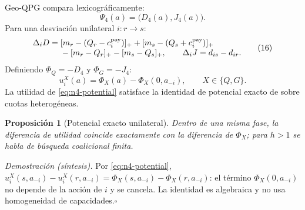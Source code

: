 \documentclass[12pt,a4paper]{article}
\newtheorem{n1prop}{Proposición}
\theoremstyle{remark}
\theoremstyle{plain}
\newcommand{\proofsketch}[1]{%
  {\small\textit{Demostración (síntesis).} #1\hfill$\square$\par}
}
\begin{document}
Geo-QPG compara lexicográficamente:
\begin{equation}
\label{eq:n4-lex}
\Psi_4(a)=\bigl(D_4(a),J_4(a)\bigr).
\tag{15}
\end{equation}
Para una desviación unilateral $i:r\to s$:
\begin{equation}
\begin{aligned}
\Delta_iD={}&[m_r-(Q_r-c_i^{\rm pay})]_+
+[m_s-(Q_s+c_i^{\rm pay})]_+\\[-1mm]
&-[m_r-Q_r]_+-[m_s-Q_s]_+,\qquad
\Delta_iJ=d_{is}-d_{ir}.
\end{aligned}
\tag{16}
\end{equation}
Definiendo $\Phi_Q=-D_4$ y $\Phi_G=-J_4$:
\begin{equation}
\label{eq:n4-potential}
u_i^X(a)=\Phi_X(a)-\Phi_X(0,a_{-i}),\qquad X\in\{Q,G\}.
\tag{17}
\end{equation}
La utilidad de \eqref{eq:n4-potential} satisface la identidad de potencial exacto
de \citet{monderer1996potential} sobre cuotas heterogéneas.
\begin{n1prop}[Potencial exacto unilateral]
Dentro de una misma fase, la diferencia de utilidad coincide exactamente con la
diferencia de $\Phi_X$; para $h>1$ se habla de búsqueda coalicional finita.
\end{n1prop}
\proofsketch{Por \eqref{eq:n4-potential},
$u_i^X(s,a_{-i})-u_i^X(r,a_{-i})=\Phi_X(s,a_{-i})-\Phi_X(r,a_{-i})$: el término
$\Phi_X(0,a_{-i})$ no depende de la acción de $i$ y se cancela. La identidad es
algebraica y no usa homogeneidad de capacidades.}
\end{document}
